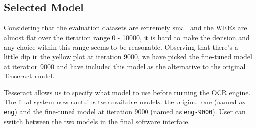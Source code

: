 \subsection{Selected Model}

Considering that the evaluation datasets are extremely small and the WERs are almost flat over the iteration range 0 - 10000, it is hard to make the decision and any choice within this range seems to be reasonable. Observing that there's a little dip in the yellow plot at iteration 9000, we have picked the fine-tuned model at iteration 9000 and have included this model as the alternative to the original Tesseract model.

Tesseract allows us to specify what model to use before running the OCR engine. The final system now contains two available models: the original one (named as \texttt{eng}) and the fine-tuned model at iteration 9000 (named as \texttt{eng-9000}). User can switch between the two models in the final software interface.